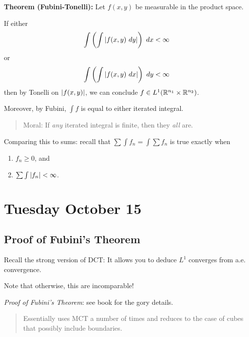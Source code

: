 \textbf{Theorem (Fubini-Tonelli):} Let \(f(x, y)\) be measurable in the
product space.

If either
\begin{align*}
\int \left( \int {\left\lvert {f(x, y) ~ dy} \right\rvert}\right) ~dx < \infty
\end{align*} or
\begin{align*}
\int \left( \int {\left\lvert {f(x, y) ~ dx} \right\rvert}\right) ~dy < \infty
\end{align*} then by Tonelli on \({\left\lvert {f(x, y)} \right\rvert}\), we can conclude
\(f\in L^1({\mathbb{R}}^{n_1} \times {\mathbb{R}}^{n_2})\).

Moreover, by Fubini, \(\int f\) is equal to either iterated integral.

\begin{quote}
Moral: If \emph{any} iterated integral is finite, then they \emph{all}
are.
\end{quote}

Comparing this to sums: recall that \(\sum \int f_n = \int \sum f_n\) is
true exactly when

\begin{enumerate}
\def\labelenumi{\arabic{enumi}.}
\tightlist
\item
  \(f_n \geq 0\), and
\item
  \(\sum \int {\left\lvert {f_n} \right\rvert} < \infty\).
\end{enumerate}

\hypertarget{tuesday-october-15}{%
\section{Tuesday October 15}\label{tuesday-october-15}}

\hypertarget{proof-of-fubinis-theorem}{%
\subsection{Proof of Fubini's Theorem}\label{proof-of-fubinis-theorem}}

Recall the strong version of DCT: It allows you to deduce \(L^1\)
converges from a.e. convergence.

Note that otherwise, this are incomparable!

\emph{Proof of Fubini's Theorem}: see book for the gory details.

\begin{quote}
Essentially uses MCT a number of times and reduces to the case of cubes
that possibly include boundaries.
\end{quote}

